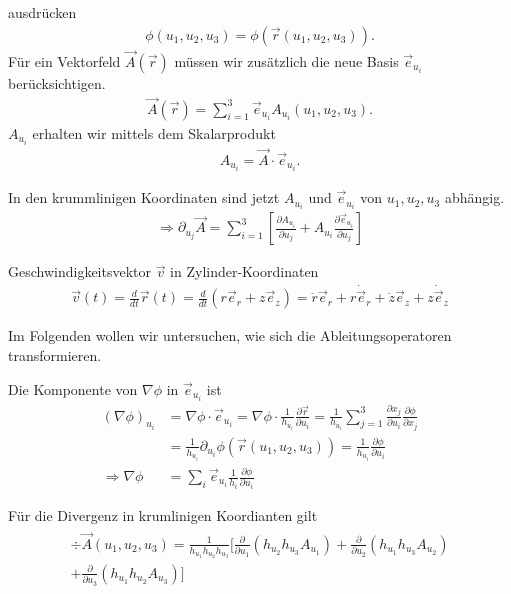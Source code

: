 ausdrücken
\begin{align*}
\phi(u_1,u_2,u_3) = \phi(\vec{r}(u_1,u_2,u_3)).
\end{align*}
Für ein Vektorfeld $\vec{A}(\vec{r})$ müssen wir zusätzlich die neue Basis
$\vec{e}_{u_i}$ berücksichtigen.
\begin{align*}
\vec{A}(\vec{r}) = \sum \limits_{i=1}^{3} \vec{e}_{u_i} A_{u_i}(u_1,u_2,u_3).
\end{align*}
$A_{u_i}$ erhalten wir mittels dem Skalarprodukt
\begin{align*}
A_{u_i} = \vec{A}\cdot\vec{e}_{u_i}.
\end{align*}
\begin{Bemerkung}
In den krummlinigen Koordinaten sind jetzt $A_{u_i}$ und $\vec{e}_{u_i}$ von
$u_1,u_2,u_3$ abhängig.
\begin{align*}
\Rightarrow \partial_{u_j} \vec{A} = \sum \limits_{i=1}^{3}
\left[\frac{\partial A_{u_i}}{\partial u_j} + A_{u_i} \frac{\partial
\vec{e}_{u_i}}{\partial u_j}\right]
\end{align*}
\end{Bemerkung}
\begin{Beispiel}
Geschwindigkeitsvektor $\vec{v}$ in Zylinder-Koordinaten
\begin{align*}
\vec{v}(t) = \frac{d}{dt}\vec{r}(t) = \frac{d}{dt}\left(r\vec{e}_r +
z\vec{e}_z\right) = \dot{r}\vec{e}_r + r\dot{\vec{e}}_r + \dot{z}\vec{e}_z +
z\dot{\vec{e}}_z
\end{align*}
\end{Beispiel}
Im Folgenden wollen wir untersuchen, wie sich die Ableitungsoperatoren
transformieren.
\begin{Definition}[Gradient]
Die Komponente von $\nabla\phi$ in $\vec{e}_{u_i}$ ist
\begin{align*}
(\nabla\phi)_{u_i} &= \nabla\phi \cdot \vec{e}_{u_i} =
\nabla\phi\cdot\frac{1}{h_{u_i}}\frac{\partial\vec{r}}{\partial u_i} =
\frac{1}{h_{u_i}} \sum \limits_{j=1}^{3}\frac{\partial x_j}{\partial u_i}
\frac{\partial \phi}{\partial x_j} \\
&= \frac{1}{h_{u_i}}
\partial_{u_i}\phi(\vec{r}(u_1,u_2,u_3)) =
\frac{1}{h_{u_i}}\frac{\partial\phi}{\partial u_i}\\
\Rightarrow  \nabla \phi &= \sum \limits_{i} \vec{e}_{u_i} \frac{1}{h_i}
\frac{\partial \phi}{\partial u_i}
\end{align*}
\end{Definition}

\begin{Definition}[Divergenz]
Für die Divergenz in krumlinigen Koordianten gilt
\begin{align*}
\begin{split}
\div \vec{A}(u_1,u_2,u_3) = \frac{1}{h_{u_1} h_{u_2}
h_{u_3}}\big[\frac{\partial}{\partial u_1} \left(h_{u_2}h_{u_3}A_{u_1}\right)
+ \frac{\partial}{\partial u_2}\left(h_{u_1} h_{u_3} A_{u_2}\right) \\ +
\frac{\partial}{\partial u_3} \left(h_{u_1} h_{u_2} A_{u_3}\right) \big]
\end{split}
\end{align*}
\end{Definition}

